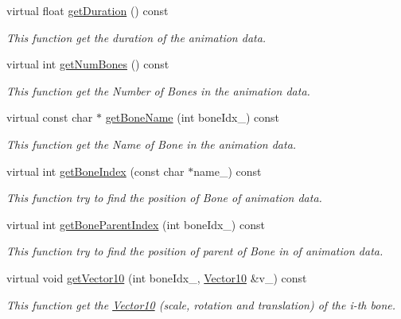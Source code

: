 \begin{DoxyCompactItemize}
virtual float \hyperlink{class_magnum_1_1_skeletal_anim_blender_a9632809b4b59659cdd5ff4c02371229e}{get\+Duration} () const 
\begin{DoxyCompactList}\small\item\em This function get the duration of the animation data. \end{DoxyCompactList}\item 
virtual int \hyperlink{class_magnum_1_1_skeletal_anim_blender_a412fe2a0748a4462d44fd9f7355ba30c}{get\+Num\+Bones} () const 
\begin{DoxyCompactList}\small\item\em This function get the Number of Bones in the animation data. \end{DoxyCompactList}\item 
virtual const char $\ast$ \hyperlink{class_magnum_1_1_skeletal_anim_blender_aa467f64b963302adc2eb4b9e96651e49}{get\+Bone\+Name} (int bone\+Idx\+\_\+) const 
\begin{DoxyCompactList}\small\item\em This function get the Name of Bone in the animation data. \end{DoxyCompactList}\item 
virtual int \hyperlink{class_magnum_1_1_skeletal_anim_blender_a02f4b2d1c647eb6000ce4950cb1baca4}{get\+Bone\+Index} (const char $\ast$name\+\_\+) const 
\begin{DoxyCompactList}\small\item\em This function try to find the position of Bone of animation data. \end{DoxyCompactList}\item 
virtual int \hyperlink{class_magnum_1_1_skeletal_anim_blender_a37e5b879823526f0f19797416f0b8742}{get\+Bone\+Parent\+Index} (int bone\+Idx\+\_\+) const 
\begin{DoxyCompactList}\small\item\em This function try to find the position of parent of Bone in of animation data. \end{DoxyCompactList}\item 
virtual void \hyperlink{class_magnum_1_1_skeletal_anim_blender_ac31d36a225bceb45d1c2410f6819d609}{get\+Vector10} (int bone\+Idx\+\_\+, \hyperlink{class_magnum_1_1_vector10}{Vector10} \&v\+\_\+) const 
\begin{DoxyCompactList}\small\item\em This function get the \hyperlink{class_magnum_1_1_vector10}{Vector10} (scale, rotation and translation) of the i-\/th bone. \end{DoxyCompactList}\item 

\end{DoxyCompactItemize}
